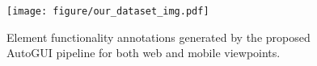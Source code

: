 \begin{figure}[t]
    \centering
    \texttt{[image: figure/our\_dataset\_img.pdf]}
    \caption{Element functionality annotations generated by the proposed AutoGUI pipeline for both web and mobile viewpoints.}
    \label{fig: our dataset}
    \vspace{-5mm}
\end{figure}